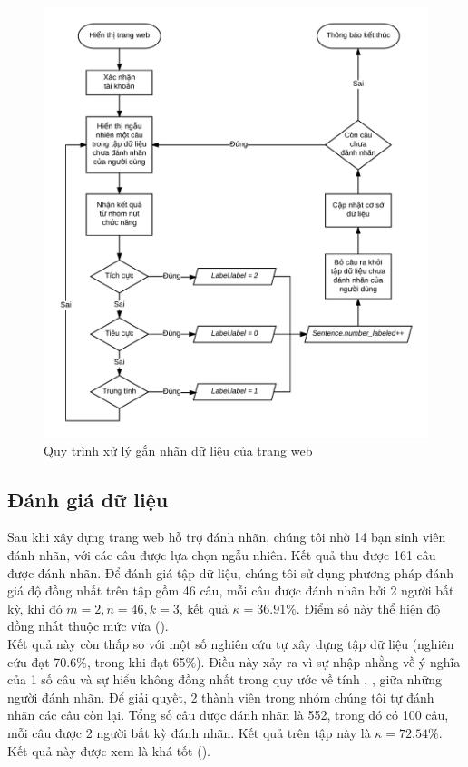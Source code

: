 \begin{figure}[H]
\centering
\includegraphics[scale=0.27]{../hinh/UpdateDatabase.png}
\caption{Quy trình xử lý gắn nhãn dữ liệu của trang web}
\label{fig:updatedb}
\end{figure}

\subsection*{Đánh giá dữ liệu}
Sau khi xây dựng trang web hỗ trợ đánh nhãn, chúng tôi nhờ 14 bạn sinh viên đánh nhãn, với các câu được lựa chọn ngẫu nhiên. Kết quả thu được 161 câu được đánh nhãn. Để đánh giá tập dữ liệu, chúng tôi sử dụng phương pháp đánh giá độ đồng nhất  trên tập gồm 46 câu, mỗi câu được đánh nhãn bởi 2 người bất kỳ, khi đó $m=2, n=46, k=3$, kết quả $\kappa = 36.91\% $. Điểm số này thể hiện độ đồng nhất thuộc mức vừa (). \\

Kết quả này còn thấp so với một số nghiên cứu tự xây dựng tập dữ liệu (nghiên cứu \cite{sarker2011outcome} đạt 70.6\%, trong khi \cite{ali2013can} đạt 65\%). Điều này xảy ra vì sự nhập nhằng về ý nghĩa của 1 số câu và sự hiểu không đồng nhất trong quy ước về tính \tichcuc, \tieucuc, \trungtinh giữa những người đánh nhãn. Để giải quyết, 2 thành viên trong nhóm chúng tôi tự đánh nhãn các câu còn lại. Tổng số câu được đánh nhãn là 552, trong đó có 100 câu, mỗi câu được 2 người bất kỳ đánh nhãn. Kết quả  trên tập này là $\kappa=72.54\%$. Kết quả này được xem là khá tốt ().

